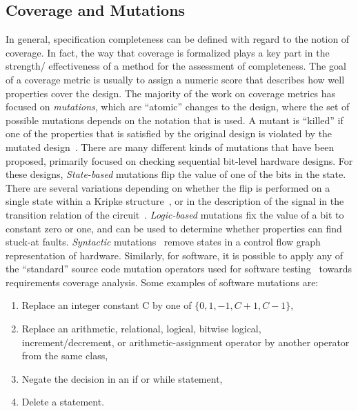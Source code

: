 \subsection{Coverage and Mutations}
In general, specification completeness can be defined with
regard to the notion of coverage. In fact, the way that coverage
is formalized plays a key part in the strength/ effectiveness of
a method for the assessment of completeness. The goal of a coverage metric is usually to assign a numeric score that describes how well properties cover the design. The majority of the work on coverage metrics has focused on {\em mutations}, which are ``atomic'' changes to the design, where the set of possible mutations depends on the notation that is used.  A mutant is ``killed'' if one of the properties that is satisfied by the original design is violated by the mutated design~\cite{chockler_coverage_2003,chockler2001practical,chockler2010coverage,Kupferman:2006:SCF,kupferman_theory_2008}.  There are many different kinds of mutations that have been proposed, primarily focused on checking sequential bit-level hardware designs.  For these designs, {\em State-based} mutations flip the value of one of the bits in the state.  There are several variations depending on whether the flip is performed on a single state within a Kripke structure~\cite{hoskote1999coverage}, or in the description of the signal in the transition relation of the circuit~\cite{chockler2001practical}.  {\em Logic-based} mutations fix the value of a bit to constant zero or one, and can be used to determine whether properties can find stuck-at faults.  {\em Syntactic} mutations~\cite{chockler_coverage_2003} remove states in a control flow graph representation of hardware.  Similarly, for software, it is possible to apply any of the ``standard'' source code mutation operators used for software testing~\cite{Andrews06:mutation} towards requirements coverage analysis.  Some examples of software mutations are:
\begin{enumerate}
    \item Replace an integer constant C by one of $\{0, 1, -1, C + 1, C - 1\}$,
    \item Replace an arithmetic, relational, logical, bitwise logical, increment/decrement, or arithmetic-assignment operator by another operator from the same class,
    \item Negate the decision in an if or while statement,
    \item Delete a statement.
\end{enumerate}

